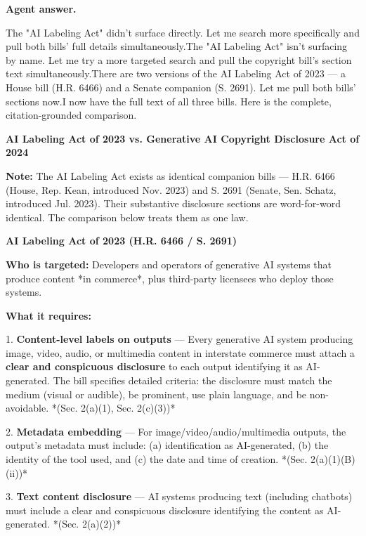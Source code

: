 \documentclass[11pt]{article}
\newcommand{\fieldlabel}[1]{\textbf{\color{navy}#1}\quad}
\begin{document}
\fieldlabel{Agent answer.}\par
The "AI Labeling Act" didn't surface directly. Let me search more specifically and pull both bills' full details simultaneously.The "AI Labeling Act" isn't surfacing by name. Let me try a more targeted search and pull the copyright bill's section text simultaneously.There are two versions of the AI Labeling Act of 2023 --- a House bill (H.R. 6466) and a Senate companion (S. 2691). Let me pull both bills' sections now.I now have the full text of all three bills. Here is the complete, citation-grounded comparison.

\textbf{AI Labeling Act of 2023 vs. Generative AI Copyright Disclosure Act of 2024}

\textbf{Note:} The AI Labeling Act exists as identical companion bills --- H.R. 6466 (House, Rep. Kean, introduced Nov. 2023) and S. 2691 (Senate, Sen. Schatz, introduced Jul. 2023). Their substantive disclosure sections are word-for-word identical. The comparison below treats them as one law.

\textbf{AI Labeling Act of 2023 (H.R. 6466 / S. 2691)}

\textbf{Who is targeted:} Developers and operators of generative AI systems that produce content *in commerce*, plus third-party licensees who deploy those systems.

\textbf{What it requires:}

1. \textbf{Content-level labels on outputs} --- Every generative AI system producing image, video, audio, or multimedia content in interstate commerce must attach a \textbf{clear and conspicuous disclosure} to each output identifying it as AI-generated. The bill specifies detailed criteria: the disclosure must match the medium (visual or audible), be prominent, use plain language, and be non-avoidable. *(Sec. 2(a)(1), Sec. 2(c)(3))*

2. \textbf{Metadata embedding} --- For image/video/audio/multimedia outputs, the output's metadata must include: (a) identification as AI-generated, (b) the identity of the tool used, and (c) the date and time of creation. *(Sec. 2(a)(1)(B)(ii))*

3. \textbf{Text content disclosure} --- AI systems producing text (including chatbots) must include a clear and conspicuous disclosure identifying the content as AI-generated. *(Sec. 2(a)(2))*
\end{document}
